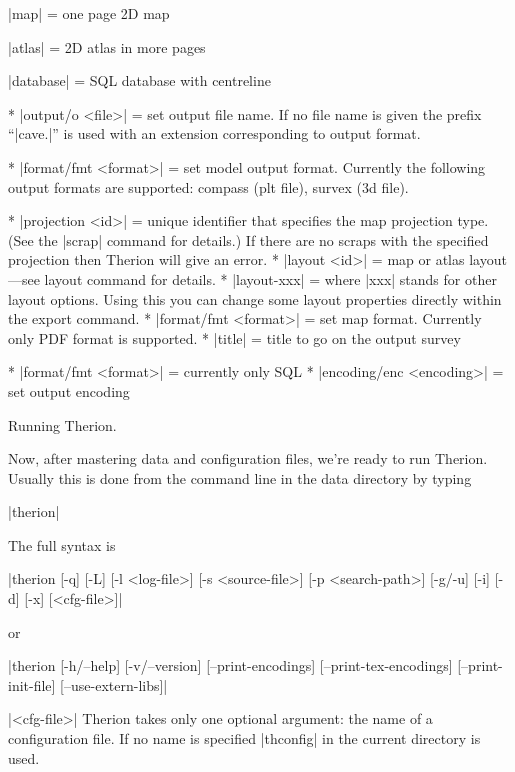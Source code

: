     |map| = one page 2D map

    |atlas| = 2D atlas in more pages

    |database| = SQL database with centreline
\endarguments

\options

  * |output/o <file>| = set output file name. If no file name is
    given the prefix ``|cave.|'' is used with an extension corresponding to
    output format.


  * |format/fmt <format>| = set model output format. Currently the following
    output formats are supported: compass (plt file), survex (3d file).

  
  * |projection <id>| = unique identifier that specifies the map projection type.
    (See the |scrap| command for details.) If there are no scraps with 
    the specified projection then Therion will give an error. 
  * |layout <id>| = map or atlas layout---see layout command for details.
  * |layout-xxx| = where |xxx| stands for other layout options. Using this
    you can change some layout properties directly within the export command.
  * |format/fmt <format>| = set map format. Currently only PDF format
    is supported.
  * |title| = title to go on the output survey    

  
  * |format/fmt <format>| = currently only SQL
  * |encoding/enc <encoding>| = set output encoding
\endoptions



\subchapter Running Therion.

Now, after mastering data and configuration files, we're ready to run Therion. 
Usually this is done from the command line in the data directory by typing

|therion|

The full syntax is

|therion [-q] [-L] [-l <log-file>]
        [-s <source-file>] [-p <search-path>]
        [-g/-u] [-i] [-d] [-x] [<cfg-file>]|

or

|therion [-h/--help]
        [-v/--version]
        [--print-encodings]
        [--print-tex-encodings]
        [--print-init-file]
        [--use-extern-libs]|

\arguments
  |<cfg-file>| 
  Therion takes only one optional argument: the name of a configuration
  file. If no name is specified |thconfig| in the current directory is used. 
\endarguments

